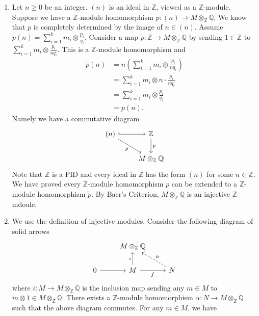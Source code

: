 \documentclass[a4paper, 12pt]{article}
\begin{document}
\begin{solution}
\begin{enumerate}[(1)]
\item Let \(n\geq 0\) be an integer. \((n)\) is an ideal in \(\mathbb{Z}\), viewed as a \(\mathbb{Z}\)-module. Suppose we have a \(\mathbb{Z}\)-module homomorphism \(p:(n)\rightarrow M\otimes_\mathbb{Z}\mathbb{Q}\). We know that 
\(p\) is completely determined by the image of \(n\in (n)\). Assume \(p(n)=\sum_{i=1}^{k}m_i\otimes \frac{p_i}{q_i}\). Consider a map \(\tilde{p}:\mathbb{Z}\rightarrow M\otimes_\mathbb{Z} \mathbb{Q}\) by sending \(1\in \mathbb{Z}\) to 
\(\sum_{i=1}^{k}m_i\otimes \frac{p_i}{nq_i}\). This is a \(\mathbb{Z}\)-module homomorphism and 
\begin{align*}
\tilde{p}(n)&=n(\sum_{i=1}^{k}m_i\otimes \frac{p_i}{nq_i})\\ 
            &=\sum_{i=1}^{k}m_i\otimes n\cdot \frac{p_i}{nq_i}\\ 
			&=\sum_{i=1}^k m_i\otimes \frac{p_i}{q_i}\\ 
			&=p(n).
\end{align*}
Namely we have a commutative diagram 
\[\begin{tikzcd}
	{(n)} & {\mathbb{Z}} \\
	& {M\otimes_\mathbb{Z}\mathbb{Q}}
	\arrow[hook, from=1-1, to=1-2]
	\arrow["p"', from=1-1, to=2-2]
	\arrow["{\tilde{p}}", from=1-2, to=2-2]
\end{tikzcd}\]
Note that \(\mathbb{Z}\) is a PID and every ideal in \(\mathbb{Z}\) has the form \((n)\) for some \(n\in \mathbb{Z}\). We have proved every \(\mathbb{Z}\)-module homomorphism \(p\) can be extended to a \(\mathbb{Z}\)-module homomorphism \(\tilde{p}\). By 
Baer's Criterion, \(M\otimes_\mathbb{Z}\mathbb{Q}\) is an injective \(\mathbb{Z}\)-mdoule. 
\item We use the definition of injective modules. Consider the following diagram of solid arrows 
\[\begin{tikzcd}
	& {M\otimes_\mathbb{Z}\mathbb{Q}} \\
	0 & M & N
	\arrow[from=2-1, to=2-2]
	\arrow["i", from=2-2, to=1-2]
	\arrow["f"', from=2-2, to=2-3]
	\arrow["\alpha"', dashed, from=2-3, to=1-2]
\end{tikzcd}\]
where \(i:M\rightarrow M\otimes_\mathbb{Z}\mathbb{Q}\) is the inclusion map sending any \(m\in M\) to \(m\otimes 1\in M\otimes_\mathbb{Z}\mathbb{Q}\). There exists a \(\mathbb{Z}\)-module homomorphism \(\alpha:N\rightarrow M\otimes_\mathbb{Z}\mathbb{Q}\) such that the above 
diagram commutes. For any \(m\in M\), we have 

\end{enumerate}
\end{solution}
\end{document}
